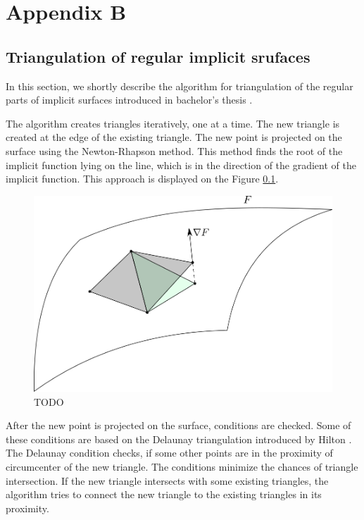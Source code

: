 \chapter*{Appendix B}
\label{appB}

\section{Triangulation of regular implicit srufaces}
\label{sub2.4}

In this section, we shortly describe the algorithm for triangulation of the regular
parts of implicit surfaces introduced in bachelor's thesis \cite{korecova2021triangulation}.

The algorithm creates triangles iteratively, one at a time. The new triangle is
created at the edge of the existing triangle. The new point is projected on the
surface using the Newton-Rhapson method. This method finds the root of the implicit
function lying on the line, which is in the direction of the gradient of the implicit
function. This approach is displayed on the Figure \ref{img:29}.
\begin{figure}
    \centerline{\includegraphics[scale=0.5]{images/img29}}
    \caption[TODO]
    {TODO}
    \label{img:29}
\end{figure}

After the new point is projected on the surface, conditions are checked. 
Some of these conditions are based on the Delaunay triangulation introduced
by Hilton \cite{hilton1996marching}. The Delaunay condition checks,
if some other points are in the proximity of circumcenter of the new triangle.
The conditions minimize the chances of triangle intersection.
If the new triangle intersects with some existing triangles, the algorithm
tries to connect the new triangle to the existing triangles in its proximity.

